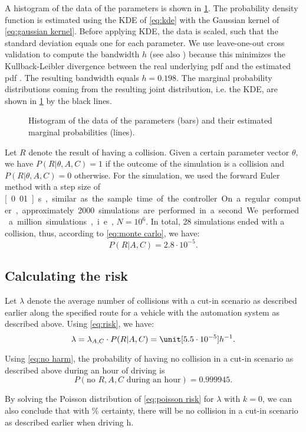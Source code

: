 A histogram of the data of the parameters is shown in \cref{fig:histogram}. The probability density function is estimated using the KDE of \cref{eq:kde} with the Gaussian kernel of \cref{eq:gaussian kernel}. Before applying KDE, the data is scaled, such that the standard deviation equals one for each parameter. We use leave-one-out cross validation to compute the bandwidth $h$ (see also \cite{duin1976parzen}) because this minimizes the Kullback-Leibler divergence between the real underlying pdf and the estimated pdf \cite{turlach1993bandwidthselection,zambom2013review}. The resulting bandwidth equals $h=0.198$. The marginal probability distributions coming from the resulting joint distribution, i.e. the KDE, are shown in \cref{fig:histogram} by the black lines.

\setlength{}
\setlength{}
\begin{figure}
	\centering
	
	\caption{Histogram of the data of the parameters (bars) and their estimated marginal probabilities (lines).}
	\label{fig:histogram}
\end{figure}


Let $R$ denote the result of having a collision. Given a certain parameter vector $\theta$, we have $P(R|\theta,A,C)=1$ if the outcome of the simulation is a collision and $P(R|\theta,A,C)=0$ otherwise. For the simulation, we used the forward Euler method with a step size of \unit[0.01]{s}, similar as the sample time of the controller. On a regular computer, approximately 2000 simulations are performed in a second. We performed a million simulations, i.e., $N=10^6$. In total, 28 simulations ended with a collision, thus, according to \cref{eq:monte carlo}, we have:
\begin{equation}
	P(R|A,C) = 2.8 \cdot 10^{-5}.
\end{equation}



\subsection{Calculating the risk}

Let $\lambda$ denote the average number of collisions with a cut-in scenario as described earlier along the specified route for a vehicle with the automation system as described above. Using \cref{eq:risk}, we have:
\begin{equation}
	\lambda = \lambda_{A,C} \cdot P(R|A,C) = \unit[5.5 \cdot 10^{-5}]{h^{-1}}.
\end{equation}

Using \cref{eq:no harm}, the probability of having no collision in a cut-in scenario as described above during an hour of driving is
\begin{equation}
	P(\text{no }R,A,C\text{ during an hour}) = 0.999945.
\end{equation}

By solving the Poisson distribution of \cref{eq:poisson risk} for $\lambda$ with $k=0$, we can also conclude that with \unit[95]{\%} certainty, there will be no collision in a cut-in scenario as described earlier when driving \unit[925]{h}.
